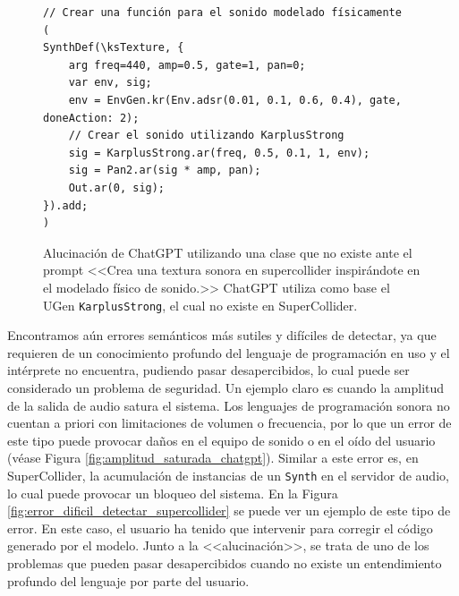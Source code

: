 \begin{figure}[H]
    \caption[Alucinación de ChatGPT utilizando una clase que no existe]{Alucinación de ChatGPT utilizando una clase que no existe ante el prompt <<Crea una textura sonora en supercollider inspirándote en el modelado físico de sonido.>> ChatGPT utiliza como base el UGen \texttt{KarplusStrong}, el cual no existe en SuperCollider.}
    \centering
    \begin{lstlisting}[style=SuperCollider-IDE, basicstyle=\footnotesize\ttfamily, numbers=none]
// Crear una función para el sonido modelado físicamente
(
SynthDef(\ksTexture, {
    arg freq=440, amp=0.5, gate=1, pan=0;
    var env, sig;
    env = EnvGen.kr(Env.adsr(0.01, 0.1, 0.6, 0.4), gate, doneAction: 2);
    // Crear el sonido utilizando KarplusStrong
    sig = KarplusStrong.ar(freq, 0.5, 0.1, 1, env);
    sig = Pan2.ar(sig * amp, pan);
    Out.ar(0, sig);
}).add;
)
    \end{lstlisting}
    \source{\propio}
    \label{fig:alucinacion_chatgpt}
\end{figure}


Encontramos aún errores semánticos más sutiles y difíciles de detectar, ya que requieren de un conocimiento profundo del lenguaje de programación en uso y el intérprete no encuentra, pudiendo pasar desapercibidos, lo cual puede ser considerado un problema de seguridad. Un ejemplo claro es cuando la amplitud de la salida de audio satura el sistema. Los lenguajes de programación sonora no cuentan a priori con limitaciones de volumen o frecuencia, por lo que un error de este tipo puede provocar daños en el equipo de sonido o en el oído del usuario (véase Figura \ref{fig:amplitud_saturada_chatgpt}). Similar a este error es, en SuperCollider, la acumulación de instancias de un \texttt{Synth} en el servidor de audio, lo cual puede provocar un bloqueo del sistema. En la Figura \ref{fig:error_dificil_detectar_supercollider} se puede ver un ejemplo de este tipo de error. En este caso, el usuario ha tenido que intervenir para corregir el código generado por el modelo. Junto a la <<alucinación>>, se trata de uno de los problemas que pueden pasar desapercibidos cuando no existe un entendimiento profundo del lenguaje por parte del usuario.

